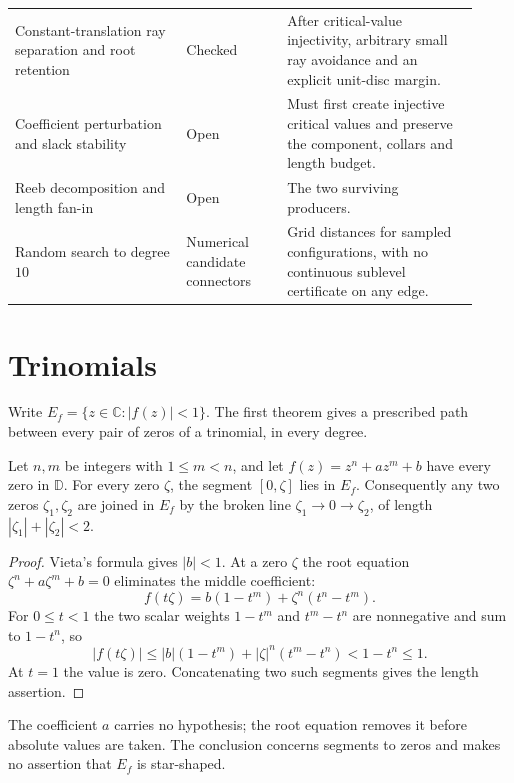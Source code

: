 \documentclass[11pt]{article}
\newcommand{\dbar}{\mathbb{D}}
\begin{document}
\begin{longtable}{@{}
  >{\raggedright\arraybackslash}p{0.34\linewidth}
  >{\raggedright\arraybackslash}p{0.20\linewidth}
  >{\raggedright\arraybackslash}p{0.38\linewidth}@{}}
Constant-translation ray separation and root retention & Checked & After critical-value injectivity, arbitrary small ray avoidance and an explicit unit-disc margin. \\
Coefficient perturbation and slack stability & Open & Must first create injective critical values and preserve the component, collars and length budget. \\
Reeb decomposition and length fan-in & Open & The two surviving producers. \\
Random search to degree $10$ & Numerical candidate connectors & Grid distances for sampled configurations, with no continuous sublevel certificate on any edge. \\
\bottomrule
\end{longtable}
\endgroup

\section{Trinomials}
\label{sec:trinomials}

Write $E_f=\{z\in\mathbb C:|f(z)|<1\}$.  The first theorem gives a prescribed
path between every pair of zeros of a trinomial, in every degree.

\begin{theorem}
\label{res:trinomial-all-degree}
Let $n,m$ be integers with $1\le m<n$, and let $f(z)=z^n+az^m+b$ have every
zero in $\dbar$.  For every zero $\zeta$, the segment $[0,\zeta]$ lies in
$E_f$.  Consequently any two zeros $\zeta_1,\zeta_2$ are joined in $E_f$ by
the broken line $\zeta_1\to0\to\zeta_2$, of length $|\zeta_1|+|\zeta_2|<2$.
\end{theorem}

\begin{proof}
Vieta's formula gives $|b|<1$.  At a zero $\zeta$ the root equation
$\zeta^n+a\zeta^m+b=0$ eliminates the middle coefficient:
\begin{equation}\label{eq:trinomial-cancellation}
 f(t\zeta)=b(1-t^m)+\zeta^n(t^n-t^m).
\end{equation}
For $0\le t<1$ the two scalar weights $1-t^m$ and $t^m-t^n$ are nonnegative
and sum to $1-t^n$, so
\[
 |f(t\zeta)|\le|b|(1-t^m)+|\zeta|^n(t^m-t^n)<1-t^n\le1 .
\]
At $t=1$ the value is zero.  Concatenating two such segments gives the length
assertion.
\end{proof}

The coefficient $a$ carries no hypothesis; the root equation removes it before
absolute values are taken.  The conclusion concerns segments to zeros and
makes no assertion that $E_f$ is star-shaped.
\end{document}

